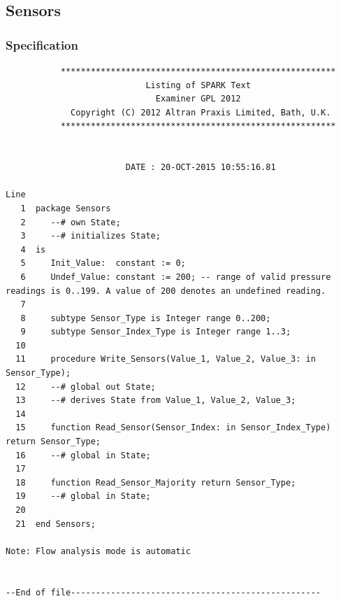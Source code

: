 \documentclass[a4paper, titlepage]{article}
\begin{document}
\subsection{Sensors}
\subsubsection{Specification}
{\tiny
\begin{lstlisting}
           *******************************************************
                            Listing of SPARK Text
                              Examiner GPL 2012
             Copyright (C) 2012 Altran Praxis Limited, Bath, U.K.
           *******************************************************


                        DATE : 20-OCT-2015 10:55:16.81

Line
   1  package Sensors
   2     --# own State;
   3     --# initializes State;
   4  is
   5     Init_Value:  constant := 0;
   6     Undef_Value: constant := 200; -- range of valid pressure readings is 0..199. A value of 200 denotes an undefined reading.
   7  
   8     subtype Sensor_Type is Integer range 0..200;
   9     subtype Sensor_Index_Type is Integer range 1..3;
  10           
  11     procedure Write_Sensors(Value_1, Value_2, Value_3: in Sensor_Type);
  12     --# global out State;
  13     --# derives State from Value_1, Value_2, Value_3;
  14  
  15     function Read_Sensor(Sensor_Index: in Sensor_Index_Type) return Sensor_Type;
  16     --# global in State;
  17  
  18     function Read_Sensor_Majority return Sensor_Type;
  19     --# global in State;
  20     
  21  end Sensors;

Note: Flow analysis mode is automatic


--End of file--------------------------------------------------

\end{lstlisting}
}
\end{document}
